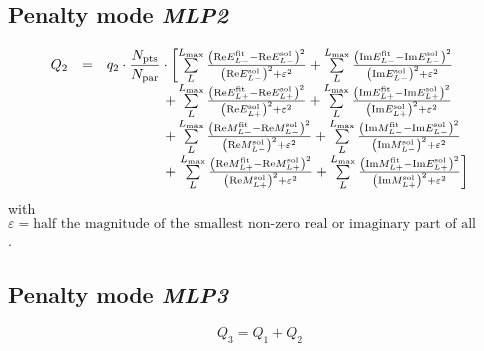 \documentclass[a4paper,10pt]{article}
\def\Re{\mathrm{Re}}
\def\Im{\mathrm{Im}}
\begin{document}
\subsection{Penalty mode \textit{MLP2}}

\begin{displaymath}
\begin{array}{lcl}
 Q_2 &=& q_2\cdot \dfrac{N_\mathrm{pts}}{N_\mathrm{par}} \cdot \left[
\sum\limits_L^{L_\mathrm{max}}
\frac{\left(\Re E_{L-}^\mathrm{fit} - \Re E_{L-}^\mathrm{sol}\right)^2}
{\left(\Re E_{L-}^\mathrm{sol}\right)^2 + \varepsilon^2}
+
\sum\limits_L^{L_\mathrm{max}}
\frac{\left(\Im E_{L-}^\mathrm{fit} - \Im E_{L-}^\mathrm{sol}\right)^2}
{\left(\Im E_{L-}^\mathrm{sol}\right)^2 + \varepsilon^2}\right.\\
&&\hspace{4.19em}+
\sum\limits_L^{L_\mathrm{max}}
\frac{\left(\Re E_{L+}^\mathrm{fit} - \Re E_{L+}^\mathrm{sol}\right)^2}
{\left(\Re E_{L+}^\mathrm{sol}\right)^2 + \varepsilon^2}
+
\sum\limits_L^{L_\mathrm{max}}
\frac{\left(\Im E_{L+}^\mathrm{fit} - \Im E_{L+}^\mathrm{sol}\right)^2}
{\left(\Im E_{L+}^\mathrm{sol}\right)^2 + \varepsilon^2}\\
&&\hspace{4.19em}+
\sum\limits_L^{L_\mathrm{max}}
\frac{\left(\Re M_{L-}^\mathrm{fit} - \Re M_{L-}^\mathrm{sol}\right)^2}
{\left(\Re M_{L-}^\mathrm{sol}\right)^2 + \varepsilon^2}
+
\sum\limits_L^{L_\mathrm{max}}
\frac{\left(\Im M_{L-}^\mathrm{fit} - \Im E_{L-}^\mathrm{sol}\right)^2}
{\left(\Im M_{L-}^\mathrm{sol}\right)^2 + \varepsilon^2}\\
&&\hspace{4.19em}+\left.
\sum\limits_L^{L_\mathrm{max}}
\frac{\left(\Re M_{L+}^\mathrm{fit} - \Re M_{L+}^\mathrm{sol}\right)^2}
{\left(\Re M_{L+}^\mathrm{sol}\right)^2 + \varepsilon^2}
+
\sum\limits_L^{L_\mathrm{max}}
\frac{\left(\Im M_{L+}^\mathrm{fit} - \Im E_{L+}^\mathrm{sol}\right)^2}
{\left(\Im M_{L+}^\mathrm{sol}\right)^2 + \varepsilon^2}
\right]
\end{array}
\end{displaymath}
with
$\varepsilon = \mbox{half the magnitude of the smallest non-zero real or imaginary part of all multipoles}$.

\subsection{Penalty mode \textit{MLP3}}
\begin{displaymath}
Q_3 = Q_1 + Q_2
\end{displaymath}
\end{document}
